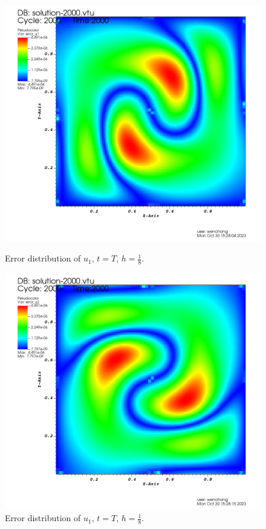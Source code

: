 \documentclass[lang=en,11pt,a4paper]{elegantpaper}
\begin{document}
\begin{figure}[H]
    \centering
    \begin{minipage}[t]{0.4\linewidth}
        \centering
        \includegraphics[width=0.8\linewidth]{png/err_ux_t=1.png}
        \caption*{\small Error distribution of $u_1$, $t=T$, $h=\frac{1}{8}$.}
    \end{minipage}
    \begin{minipage}[t]{0.4\linewidth}
        \centering
        \includegraphics[width=0.8\linewidth]{png/err_uy_t=1.png}
        \caption*{\small Error distribution of $u_1$, $t=T$, $h=\frac{1}{8}$.}
    \end{minipage}
\end{figure}
\end{document}
